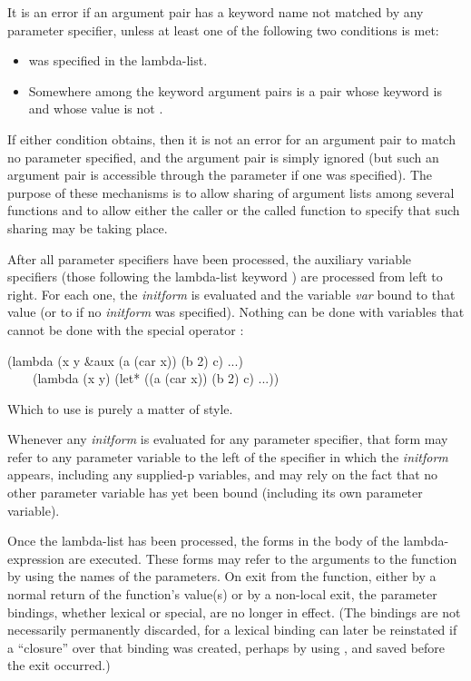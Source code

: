 It is an error if an argument pair has a keyword name not matched
by any parameter specifier, unless at least one of the following
two conditions is met:

\begin{itemize}
\item
{} was specified in the lambda-list.

\item
Somewhere among the keyword argument pairs is a pair whose keyword
is  and whose value is not {\false}.
\end{itemize}
If either condition obtains, then it is not an error
for an argument pair to match no parameter specified,
and the argument pair is simply ignored (but such an
argument pair is accessible through the  parameter if
one was specified). The purpose of these mechanisms is to
allow sharing of argument lists among several functions
and to allow either the caller or the called function
to specify that such sharing may be taking place.

After all parameter specifiers have been processed, the auxiliary
variable specifiers (those following the lambda-list keyword ) are processed from
left to right.  For each one, the \emph{initform} is evaluated and the
variable \emph{var} bound to that value (or to {\false} if no \emph{initform} was
specified).  Nothing can be done with  variables that cannot be
done with the special operator :
\begin{lisp}
(lambda (x y \&aux (a (car x)) (b 2) c) ...) \\
~~~\EQ\ (lambda (x y) (let* ((a (car x)) (b 2) c) ...))
\end{lisp}

Which to use is purely a matter of style.

Whenever any \emph{initform} is evaluated for any parameter
specifier, that form may refer to any parameter variable to the left of
the specifier in which the \emph{initform} appears, including any supplied-p
variables, and may rely on the fact that no other parameter variable
has yet been bound (including its own parameter variable).

Once the lambda-list has been processed, the forms in the body of the
lambda-expression are executed.  These forms may refer to the arguments
to the function by using the names of the parameters.  On exit from the
function, either by a normal return of the function's value(s) or by a
non-local exit, the parameter bindings, whether lexical or special, are
no longer in effect.  (The bindings are not necessarily permanently discarded,
for a lexical binding can later be reinstated if a
``closure'' over that binding was created,
perhaps by using , and saved before the exit occurred.)

